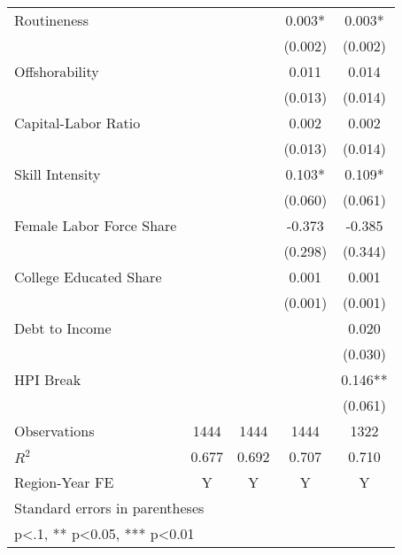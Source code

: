 \begin{table}[htbp]
\begin{tabular}{l*{4}{c}}
\addlinespace
Routineness         &            &            &    0.003*  &    0.003*  \\
                    &            &            &  (0.002)   &  (0.002)   \\
\addlinespace
Offshorability      &            &            &    0.011   &    0.014   \\
                    &            &            &  (0.013)   &  (0.014)   \\
\addlinespace
Capital-Labor Ratio &            &            &    0.002   &    0.002   \\
                    &            &            &  (0.013)   &  (0.014)   \\
\addlinespace
Skill Intensity     &            &            &    0.103*  &    0.109*  \\
                    &            &            &  (0.060)   &  (0.061)   \\
\addlinespace
Female Labor Force Share&            &            &   -0.373   &   -0.385   \\
                    &            &            &  (0.298)   &  (0.344)   \\
\addlinespace
College Educated Share&            &            &    0.001   &    0.001   \\
                    &            &            &  (0.001)   &  (0.001)   \\
\addlinespace
Debt to Income      &            &            &            &    0.020   \\
                    &            &            &            &  (0.030)   \\
\addlinespace
HPI Break           &            &            &            &    0.146** \\
                    &            &            &            &  (0.061)   \\
\midrule
Observations        &     1444   &     1444   &     1444   &     1322   \\
\(R^{2}\)           &    0.677   &    0.692   &    0.707   &    0.710   \\
Region-Year FE      &        Y   &        Y   &        Y   &        Y   \\
\bottomrule
\multicolumn{5}{l}{\footnotesize Standard errors in parentheses}\\
\multicolumn{5}{l}{\footnotesize * p<.1, ** p<0.05, *** p<0.01}\\
\end{tabular}
\end{table}
